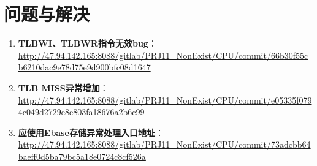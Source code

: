 
\section{问题与解决}

\begin{enumerate}
    \item {\bf TLBWI、TLBWR指令无效bug}：\url{http://47.94.142.165:8088/gitlab/PRJ11_NonExist/CPU/commit/66b30f55cb6210dac9e78d75e9d900bfc08d1647}
    \item {\bf TLB MISS异常增加}：\url{http://47.94.142.165:8088/gitlab/PRJ11_NonExist/CPU/commit/e05335f0794c049d2729e8e803fa18676a2b6c99}
    \item {\bf 应使用Ebase存储异常处理入口地址}：\url{http://47.94.142.165:8088/gitlab/PRJ11_NonExist/CPU/commit/73adcbb64baeff0d5ba79bc5a18e0724c8cf526a}
\end{enumerate}
